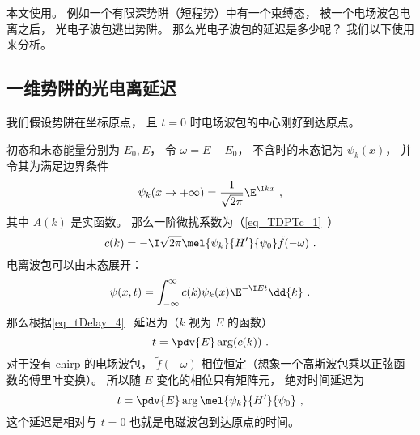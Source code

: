 
\begin{issues}
\issueDraft
\end{issues}


本文使用。 例如一个有限深势阱（短程势）中有一个束缚态， 被一个电场波包电离之后， 光电子波包逃出势阱。 那么光电子波包的延迟是多少呢？ 我们以下使用来分析。

\subsection{一维势阱的光电离延迟}
我们假设势阱在坐标原点， 且 $t = 0$ 时电场波包的中心刚好到达原点。

初态和末态能量分别为 $E_0, E$， 令 $\omega = E - E_0$， 不含时的末态记为 $\psi_k(x)$， 并令其为满足边界条件
\begin{equation}\label{eq_HeAna2_2}
\psi_k(x \to +\infty) = \frac{1}{\sqrt{2\pi}}\E^{\I kx}~,
\end{equation}
其中 $A(k)$ 是实函数。 那么一阶微扰系数为（\autoref{eq_TDPTc_1}~）
\begin{equation}
c(k) = -\I \sqrt{2\pi} \mel{\psi_k}{H'}{\psi_0} \tilde f(-\omega)~.
\end{equation}
电离波包可以由末态展开：
\begin{equation}
\psi(x, t) = \int_{-\infty}^{\infty} c(k) \psi_k(x)\E^{-\I E t} \dd{k}~.
\end{equation}
那么根据\autoref{eq_tDelay_4}~ 延迟为（$k$ 视为 $E$ 的函数）
\begin{equation}\label{eq_HeAna2_3}
t = \pdv{E} \arg (c(k))~.
\end{equation}
对于没有 chirp 的电场波包， $\tilde f(-\omega)$ 相位恒定（想象一个高斯波包乘以正弦函数的傅里叶变换）。 所以随 $E$ 变化的相位只有矩阵元， 绝对时间延迟为
\begin{equation}\label{eq_HeAna2_1}
t = \pdv{E} \arg \mel{\psi_k}{H'}{\psi_0}~,
\end{equation}
这个延迟是相对与 $t = 0$ 也就是电磁波包到达原点的时间。

